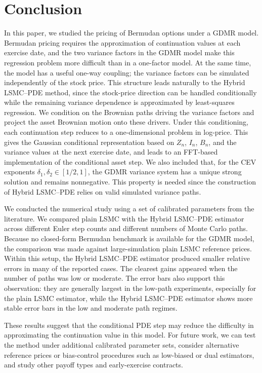 \documentclass[pdflatex,sn-mathphys-num]{sn-jnl}
\theoremstyle{thmstyleone}%
\theoremstyle{thmstylethree}%
\theoremstyle{thmstyletwo}%
\begin{document}
\section{Conclusion}\label{sec:conclusion}

In this paper, we studied the pricing of Bermudan options under a GDMR model. Bermudan pricing requires the approximation of continuation values at each exercise date, and the two variance factors in the GDMR model make this regression problem more difficult than in a one-factor model. At the same time, the model has a useful one-way coupling; the variance factors can be simulated independently of the stock price. This structure leads naturally to the Hybrid LSMC--PDE method, since the stock-price direction can be handled conditionally while the remaining variance dependence is approximated by least-squares regression. We condition on the Brownian paths driving the variance factors and project the asset Brownian motion onto these drivers. Under this conditioning, each continuation step reduces to a one-dimensional problem in log-price. This gives the Gaussian conditional representation based on $Z_n$, $I_n$, $B_n$, and the variance values at the next exercise date, and leads to an FFT-based implementation of the conditional asset step. We also included that, for the CEV exponents $\delta_1,\delta_2 \in [1/2,1]$, the GDMR variance system has a unique strong solution and remains nonnegative. This property is needed since the construction of Hybrid LSMC--PDE relies on valid simulated variance paths.

We conducted the numerical study using a set of calibrated parameters from the literature. We compared plain LSMC with the Hybrid LSMC--PDE estimator across different Euler step counts and different numbers of Monte Carlo paths. Because no closed-form Bermudan benchmark is available for the GDMR model, the comparison was made against large-simulation plain LSMC reference prices. Within this setup, the Hybrid LSMC--PDE estimator produced smaller relative errors in many of the reported cases. The clearest gains appeared when the number of paths was low or moderate. The error bars also support this observation: they are generally
largest in the low-path experiments, especially for the plain LSMC estimator, while the
Hybrid LSMC--PDE estimator shows more stable error bars in the low and
moderate path regimes. 

These results suggest that the conditional PDE step may reduce the difficulty in approximating the continuation value in this model. For future work, we can test the method under additional calibrated parameter sets, consider alternative reference prices or bias-control procedures such as low-biased or dual estimators, and study other payoff types and early-exercise contracts.
\end{document}
